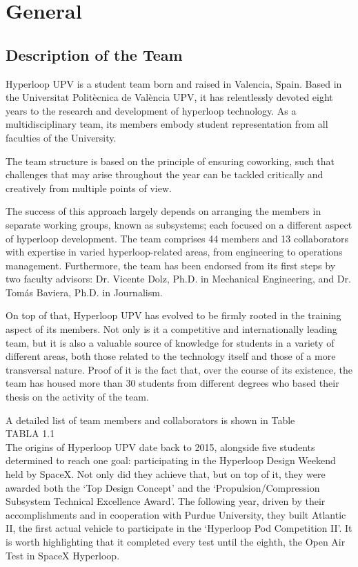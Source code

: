 \part*{General}
\chapter*{Description of the Team}


Hyperloop UPV is a student team born and raised in Valencia, Spain. Based in the Universitat Politècnica de València UPV, it has relentlessly devoted eight years to the research and development of hyperloop technology. As a multidisciplinary team, its members embody student representation from all faculties of the University. 

The team structure is based on the principle of ensuring coworking, such that challenges that may arise throughout the year can be tackled critically and creatively from multiple points of view.

The success of this approach largely depends on arranging the members in separate working groups, known as subsystems; each focused on a different aspect of hyperloop development. The team comprises 44 members and 13 collaborators with expertise in varied hyperloop-related areas, from engineering to operations management. Furthermore, the team has been endorsed from its first steps by two faculty advisors: Dr. Vicente Dolz, Ph.D. in Mechanical Engineering, and Dr. Tomás Baviera, Ph.D. in Journalism. 

On top of that, Hyperloop UPV has evolved to be firmly rooted in the training aspect of its members. Not only is it a competitive and internationally leading team, but it is also a valuable source of knowledge for students in a variety of different areas, both those related to the technology itself and those of a more transversal nature. Proof of it is the fact that, over the course of its existence, the team has housed more than 30 students from different degrees who based their thesis on the activity of the team.

A detailed list of team members and collaborators is shown in Table %
\\
TABLA 1.1
\\
The origins of Hyperloop UPV date back to 2015, alongside five students determined to reach one goal: participating in the Hyperloop Design Weekend held by SpaceX. Not only did they achieve that, but on top of it, they were awarded both the ‘Top Design Concept’ and the ‘Propulsion/Compression Subsystem Technical Excellence Award’. The following year, driven by their accomplishments and in cooperation with Purdue University, they built Atlantic II, the first actual vehicle to participate in the ‘Hyperloop Pod Competition II’. It is worth highlighting that it completed every test until the eighth, the Open Air Test in SpaceX Hyperloop. 

